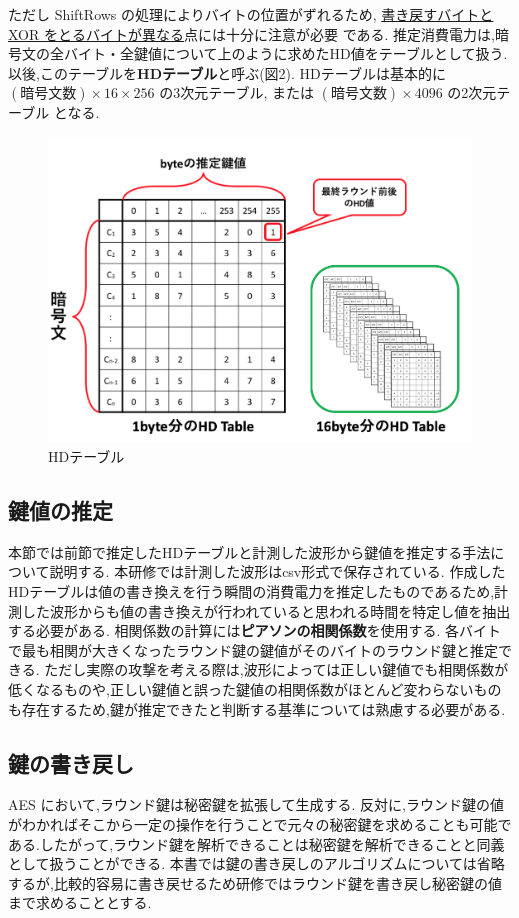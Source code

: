 \documentclass[11pt]{jarticle}
\begin{document}
\vspace{0.7cm}
ただし ShiftRows の処理によりバイトの位置がずれるため,
\underline{書き戻すバイトと XOR をとるバイトが異なる}点には十分に注意が必要
である.
推定消費電力は,暗号文の全バイト・全鍵値について上のように求めたHD値をテーブルとして扱う.
以後,このテーブルを\textbf{HDテーブル}と呼ぶ(図2).
HDテーブルは基本的に $(暗号文数) \times 16 \times 256$ の3次元テーブル,
または $(暗号文数) \times 4096$ の2次元テーブル
となる.

\newpage
\begin{figure}[htbp]
	\begin{center}
		\includegraphics[width=0.8\hsize, bb=0 0 600 500]{../images/CPA_image2.png}
		\caption{HDテーブル}
	\end{center}
\end{figure}

\subsection{鍵値の推定}
本節では前節で推定したHDテーブルと計測した波形から鍵値を推定する手法について説明する.
本研修では計測した波形はcsv形式で保存されている.
作成したHDテーブルは値の書き換えを行う瞬間の消費電力を推定したものであるため,計測した波形からも値の書き換えが行われていると思われる時間を特定し値を抽出する必要がある.
相関係数の計算には\textbf{ピアソンの相関係数}を使用する.
各バイトで最も相関が大きくなったラウンド鍵の鍵値がそのバイトのラウンド鍵と推定できる.
ただし実際の攻撃を考える際は,波形によっては正しい鍵値でも相関係数が低くなるものや,正しい鍵値と誤った鍵値の相関係数がほとんど変わらないものも存在するため,鍵が推定できたと判断する基準については熟慮する必要がある.

\subsection{鍵の書き戻し}
AES において,ラウンド鍵は秘密鍵を拡張して生成する.
反対に,ラウンド鍵の値がわかればそこから一定の操作を行うことで元々の秘密鍵を求めることも可能である.したがって,ラウンド鍵を解析できることは秘密鍵を解析できることと同義として扱うことができる.
本書では鍵の書き戻しのアルゴリズムについては省略するが,比較的容易に書き戻せるため研修ではラウンド鍵を書き戻し秘密鍵の値まで求めることとする.
\end{document}
